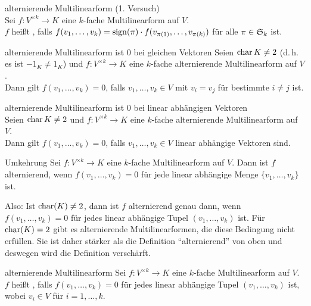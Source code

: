 \begin{Def}{alternierende Multilinearform (1. Versuch)} \\
    Sei $f: V^{\times k} \rightarrow K$ eine $k$-fache Multilinearform auf
    $V$. \\
    $f$ heißt , falls
    $f(v_1, \dotsc, v_k) = \operatorname{sign}(\pi) \cdot f(v_{\pi(1)}, \dotsc, v_{\pi(k)})$
    für alle $\pi \in \mathfrak{S}_k$ ist.
\end{Def}

\begin{Lemma}{alternierende Multilinearform ist $0$ bei gleichen Vektoren}
    Seien $\operatorname{char} K \not= 2$ (d.\,h. es ist $-1_K \not= 1_K$) und
    $f: V^{\times k} \rightarrow K$ eine $k$-fache alternierende
    Multilinearform auf $V$. \\
    Dann gilt $f(v_1, \dotsc, v_k) = 0$, falls
    $v_1, \dotsc, v_k \in V$ mit $v_i = v_j$ für bestimmte $i \not= j$ ist.
\end{Lemma}

\begin{Lemma}{alternierende Multilinearform ist $0$ bei linear abhängigen
              Vektoren} \\
    Seien $\operatorname{char} K \not= 2$ und
    $f: V^{\times k} \rightarrow K$ eine $k$-fache alternierende
    Multilinearform auf $V$. \\
    Dann gilt $f(v_1, \dotsc, v_k) = 0$, falls
    $v_1, \dotsc, v_k \in V$ linear abhängige Vektoren sind.
\end{Lemma}

\begin{Lemma}{Umkehrung}
    Sei $f: V^{\times k} \rightarrow K$ eine $k$-fache Multilinearform auf $V$.
    Dann ist $f$ alternierend, wenn
    $f(v_1, \dotsc, v_k) = 0$ für jede linear abhängige Menge
    $\{v_1, \dotsc, v_k\}$ ist.
\end{Lemma}

\begin{Bem}
    Also: Ist $\operatorname{char}(K) \not= 2$, dann ist $f$ alternierend genau dann,
    wenn $f(v_1, \dotsc, v_k) = 0$ für jedes linear abhängige Tupel
    $(v_1, \dotsc, v_k)$ ist.
    Für $\operatorname{char}(K) = 2$ gibt es alternierende Multilinearformen, die diese
    Bedingung nicht erfüllen.
    Sie ist daher stärker als die Definition "`alternierend"' von oben und
    deswegen wird die Definition verschärft.
\end{Bem}

\pagebreak

\begin{Def}{alternierende Multilinearform}
    Sei $f: V^{\times k} \rightarrow K$ eine $k$-fache Multilinearform auf
    $V$. \\
    $f$ heißt , falls $f(v_1, \dotsc, v_k) = 0$
    für jedes linear abhängige Tupel $(v_1, \dotsc, v_k)$ ist,
    wobei $v_i \in V$ für $i = 1, \dotsc, k$.
\end{Def}


